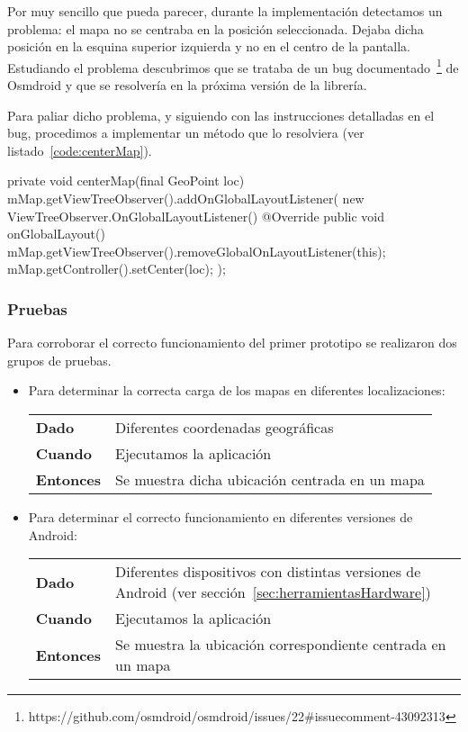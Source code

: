 Por muy sencillo que pueda parecer, durante la implementación detectamos un problema: el mapa no se
centraba en la posición seleccionada. Dejaba dicha posición en la esquina superior izquierda y no en
el centro de la pantalla. Estudiando el problema descubrimos que se trataba de un bug
documentado~\footnote{https://github.com/osmdroid/osmdroid/issues/22\#issuecomment-43092313} de
Osmdroid y que se resolvería en la próxima versión de la librería.

Para paliar dicho problema, y siguiendo con las instrucciones detalladas en el bug, procedimos a
implementar un método que lo resolviera (ver listado~\ref{code:centerMap}).

\begin{listing}[
  float=ht,
  language = java,
  caption  = {Método utilizado para centrar el mapa en cualquier posición},
  label    = code:centerMap]
private void centerMap(final GeoPoint loc) {
    mMap.getViewTreeObserver().addOnGlobalLayoutListener(
            new ViewTreeObserver.OnGlobalLayoutListener() {
        @Override
        public void onGlobalLayout() {
            mMap.getViewTreeObserver().removeGlobalOnLayoutListener(this);
            mMap.getController().setCenter(loc);
        }
    });
}
\end{listing}

\subsubsection{Pruebas}

Para corroborar el correcto funcionamiento del primer prototipo se realizaron dos grupos de pruebas.

\newpage
\begin{itemize}
  \item Para determinar la correcta carga de los mapas en diferentes localizaciones:

  \begin{tabular}{p{}p{}}
    \hline
    \textbf{Dado}     & Diferentes coordenadas geográficas \\
    \textbf{Cuando}   & Ejecutamos la aplicación \\
    \textbf{Entonces} & Se muestra dicha ubicación centrada en un mapa \\
    \hline
  \end{tabular}

  \item Para determinar el correcto funcionamiento en diferentes versiones de Android:

  \begin{tabular}{p{}p{}}
    \hline 
    \textbf{Dado} & Diferentes dispositivos con distintas versiones de Android (ver
    sección~\ref{sec:herramientasHardware}) \\
    \textbf{Cuando} & Ejecutamos la aplicación \\ 
    \textbf{Entonces} & Se muestra la ubicación correspondiente centrada en un mapa \\ 
    \hline
  \end{tabular}
\end{itemize}

